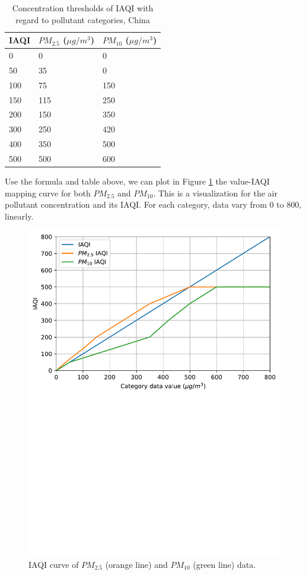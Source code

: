 \begin{table}[!htbp]
    \centering
    \caption{Concentration thresholds of IAQI with regard to pollutant categories, China}
    \label{table:IAQI-thresholds}
    \begin{tabular}{|l|l|l|}
    \hline
    IAQI & $PM_{2.5}$ ($\mu g/m^3$) & $PM_{10}$ ($\mu g/m^3$) \\ \hline
    0    & 0   & 0   \\ \hline
    50   & 35  & 0   \\ \hline
    100  & 75  & 150 \\ \hline
    150  & 115 & 250 \\ \hline
    200  & 150 & 350 \\ \hline
    300  & 250 & 420 \\ \hline
    400  & 350 & 500 \\ \hline
    500  & 500 & 600 \\ \hline
    \end{tabular}
\end{table}

Use the formula and table above, we can plot in Figure \ref{fig:iaqi} the value-IAQI mapping curve for both $PM_{2.5}$ and $PM_{10}$. This is a visualization for the air pollutant concentration and its IAQI. For each category, data vary from 0 to 800, linearly.

\begin{figure}[!htbp]
    \centering
    \includegraphics[width=0.7\linewidth]{fig/iqai.pdf}
    \caption{IAQI curve of $PM_{2.5}$ (orange line) and $PM_{10}$ (green line) data.}
    \label{fig:iaqi}
\end{figure}

